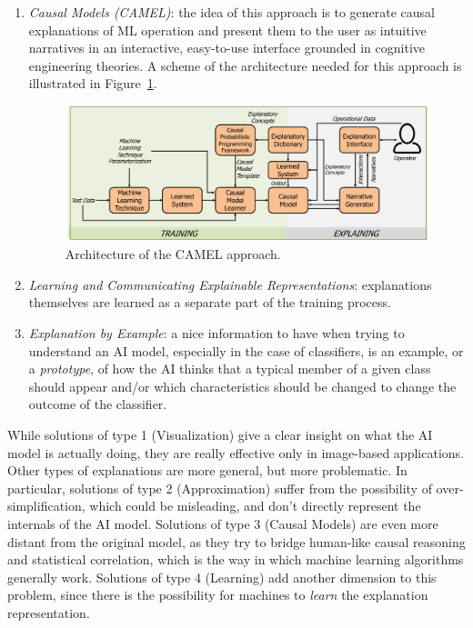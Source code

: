 \documentclass[conference]{IEEEtran}
\newcommand{\cit}[1][]{\todo[tickmarkheight=0.2cm]{cit #1}}
\begin{document}
\begin{enumerate}
    \item \textit{Causal Models (CAMEL)}: \cit the idea of this approach is to generate causal explanations of ML operation and present them to the user as intuitive narratives in an interactive, easy-to-use interface grounded in cognitive engineering theories. A scheme of the architecture needed for this approach is illustrated in Figure~\ref{fig:camel}.

          \begin{figure}[ht!] \centering
              \includegraphics[width=0.9\linewidth]{images/camel.png} \caption{Architecture of the CAMEL approach.} \label{fig:camel} \end{figure}

    \item \textit{Learning and Communicating Explainable Representations}: explanations themselves are learned as a separate part of the training process.

    \item \textit{Explanation by Example}: a nice information to have when
          trying to understand an AI model, especially in the case of
          classifiers, is an example, or a \textit{prototype}, of how the AI
          thinks that a typical member of a given class should appear and/or which characteristics should be changed to change the outcome of the classifier.
\end{enumerate}

While solutions of type 1 (Visualization) give a clear insight on what the AI model is actually doing, they are really effective only in image-based applications. Other types of explanations are more general, but more problematic. In particular, solutions of type 2 (Approximation) suffer from the possibility of over-simplification, which could be misleading, and don't directly represent the internals of the AI model. Solutions of type 3 (Causal Models) are even more distant from the original model, as they try to bridge human-like causal reasoning and statistical correlation, which is the way in which machine learning algorithms generally work. Solutions of type 4 (Learning) add another dimension to this problem, since there is the possibility for machines to \textit{learn} the explanation representation.
\end{document}
